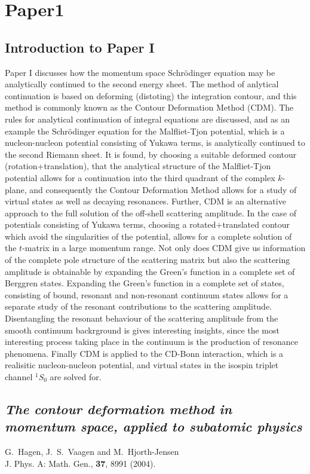 \chapter{Paper1}
\section{Introduction to Paper I} 
Paper I discusses how the momentum space Schr\"odinger equation
may be analytically continued to the second energy sheet. 
The method of anlytical continuation is based on 
deforming (distoting) the integration contour, and this method
is commonly known as the Contour Deformation Method (CDM). 
The rules for analytical continuation of integral equations
are discussed, and as an example the Schr\"odinger equation for the
Malfliet-Tjon potential, which is a nucleon-nucleon 
potential consisting of Yukawa terms, is analytically continued 
to the second Riemann sheet. 
It is found, by choosing a suitable deformed contour (rotation+translation), 
that the analytical  structure of the Malfliet-Tjon 
potential allows for a continuation into the third
quadrant of the complex $k$-plane, and consequently 
the Contour Deformation Method allows for a study 
of virtual states as well as decaying resonances. Further, CDM 
is an alternative approach to the full solution of the off-shell
scattering amplitude. In the case of potentials
consisting of Yukawa terms, choosing a rotated+translated
contour which avoid the singularities of the potential, 
allows for a complete solution of the $t$-matrix 
in a large momentum range. Not only does CDM give us information 
of the complete pole structure of the scattering matrix 
but also the scattering amplitude is obtainable by expanding
the Green's function in a complete set of Berggren states.
Expanding the Green's function in a complete set of states, 
consisting of bound, resonant and non-resonant continuum states
allows for a separate study of the resonant contributions 
to the scattering amplitude. Disentangling the resonant
behaviour of the scattering amplitude from the 
smooth continuum backrground is gives interesting
insights, since the most interesting process taking
place in the continuum is the production of resonance  
phenomena. Finally CDM is applied to the 
CD-Bonn  interaction, which is a realisitic nucleon-nucleon
potential, and virtual states in the isospin triplet channel 
$^1S_0 $ are solved for.  
  
\newpage
\section{\it The contour deformation method in momentum space, applied to subatomic physics} 
\label{sec:paper1}
{\Large G.~Hagen, J.~S.~Vaagen and M.~Hjorth-Jensen \\[0.5cm]
  J. Phys. A: Math. Gen., {\bf 37}, 8991 (2004).}


